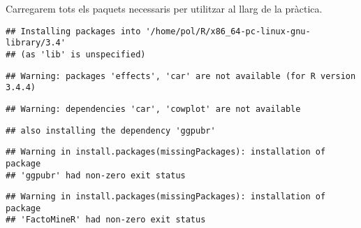 \documentclass[12pt,]{article}
\newenvironment{Shaded}{\begin{snugshade}}{\end{snugshade}}
\newcommand{\ControlFlowTok}[1]{\textcolor[rgb]{0.13,0.29,0.53}{\textbf{#1}}}
\newcommand{\DataTypeTok}[1]{\textcolor[rgb]{0.13,0.29,0.53}{#1}}
\newcommand{\KeywordTok}[1]{\textcolor[rgb]{0.13,0.29,0.53}{\textbf{#1}}}
\newcommand{\NormalTok}[1]{#1}
\newcommand{\OperatorTok}[1]{\textcolor[rgb]{0.81,0.36,0.00}{\textbf{#1}}}
\newcommand{\StringTok}[1]{\textcolor[rgb]{0.31,0.60,0.02}{#1}}
\begin{document}
Carregarem tots els paquets necessaris per utilitzar al llarg de la
pràctica.

\begin{Shaded}
\end{Shaded}

\begin{verbatim}
## Installing packages into '/home/pol/R/x86_64-pc-linux-gnu-library/3.4'
## (as 'lib' is unspecified)
\end{verbatim}

\begin{verbatim}
## Warning: packages 'effects', 'car' are not available (for R version 3.4.4)
\end{verbatim}

\begin{verbatim}
## Warning: dependencies 'car', 'cowplot' are not available
\end{verbatim}

\begin{verbatim}
## also installing the dependency 'ggpubr'
\end{verbatim}

\begin{verbatim}
## Warning in install.packages(missingPackages): installation of package
## 'ggpubr' had non-zero exit status
\end{verbatim}

\begin{verbatim}
## Warning in install.packages(missingPackages): installation of package
## 'FactoMineR' had non-zero exit status
\end{verbatim}
\end{document}

